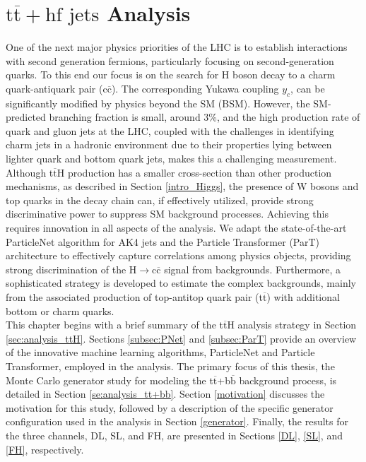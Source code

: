 \cleardoublepage%
\chapter{\label{chap:res}$\text{t}\overline{\text{t}}+\text{hf jets}$ Analysis}%
%
\noindent One of the next major physics priorities of the LHC is to establish interactions with second generation fermions, particularly focusing on second-generation quarks. To this end our focus is on the search for H boson decay to a charm quark-antiquark pair (c$\overline{\text{c}}$). The corresponding Yukawa coupling $y_c$, can be significantly modified by physics beyond the SM (BSM). However, the SM-predicted branching fraction is small, around 3\%, and the high production rate of quark and gluon jets at the LHC, coupled with the challenges in identifying charm jets in a hadronic environment due to their properties lying between lighter quark and bottom quark jets, makes this a challenging measurement. Although t$\overline{\text{t}}$H production has a smaller cross-section than other production mechanisms, as described in Section \ref{intro_Higgs}, the presence of W bosons and top quarks in the decay chain can, if effectively utilized, provide strong discriminative power to suppress SM background processes. Achieving this requires innovation in all aspects of the analysis. We adapt the state-of-the-art ParticleNet algorithm for AK4 jets and the Particle Transformer (ParT) architecture to effectively capture correlations among physics objects, providing strong discrimination of the H$\rightarrow$c$\overline{\text{c}}$ signal from backgrounds. Furthermore, a sophisticated strategy is developed to estimate the complex backgrounds, mainly from the associated production of top-antitop quark pair (t$\overline{\text{t}}$) with additional bottom or charm quarks.\\
\indent This chapter begins with a brief summary of the t$\overline{\text{t}}$H analysis strategy in Section \ref{sec:analysis_ttH}. Sections \ref{subsec:PNet} and \ref{subsec:ParT} provide an overview of the innovative machine learning algorithms, ParticleNet and Particle Transformer, employed in the analysis. The primary focus of this thesis, the Monte Carlo generator study for modeling the t$\overline{\text{t}}$+b$\overline{\text{b}}$ background process, is detailed in Section \ref{se:analysis_tt+bb}. Section \ref{motivation} discusses the motivation for this study, followed by a description of the specific generator configuration used in the analysis in Section \ref{generator}. Finally, the results for the three channels, DL, SL, and FH, are presented in Sections \ref{DL}, \ref{SL}, and \ref{FH}, respectively.

